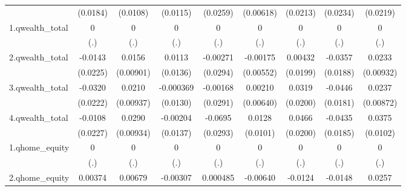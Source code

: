 {\begin{tabular}{l*{8}{c}}
            &    (0.0184)         &    (0.0108)         &    (0.0115)         &    (0.0259)         &   (0.00618)         &    (0.0213)         &    (0.0234)         &    (0.0219)         \\
[1em]
1.qwealth\_total&           0         &           0         &           0         &           0         &           0         &           0         &           0         &           0         \\
            &         (.)         &         (.)         &         (.)         &         (.)         &         (.)         &         (.)         &         (.)         &         (.)         \\
[1em]
2.qwealth\_total&     -0.0143         &      0.0156         &      0.0113         &    -0.00271         &    -0.00175         &     0.00432         &     -0.0357         &      0.0233\sym{*}  \\
            &    (0.0225)         &   (0.00901)         &    (0.0136)         &    (0.0294)         &   (0.00552)         &    (0.0199)         &    (0.0188)         &   (0.00932)         \\
[1em]
3.qwealth\_total&     -0.0320         &      0.0210\sym{*}  &   -0.000369         &    -0.00168         &     0.00210         &      0.0319         &     -0.0446\sym{*}  &      0.0237\sym{**} \\
            &    (0.0222)         &   (0.00937)         &    (0.0130)         &    (0.0291)         &   (0.00640)         &    (0.0200)         &    (0.0181)         &   (0.00872)         \\
[1em]
4.qwealth\_total&     -0.0108         &      0.0290\sym{**} &    -0.00204         &     -0.0695\sym{*}  &      0.0128         &      0.0466\sym{*}  &     -0.0435\sym{*}  &      0.0375\sym{***}\\
            &    (0.0227)         &   (0.00934)         &    (0.0137)         &    (0.0293)         &    (0.0101)         &    (0.0200)         &    (0.0185)         &    (0.0102)         \\
[1em]
1.qhome\_equity&           0         &           0         &           0         &           0         &           0         &           0         &           0         &           0         \\
            &         (.)         &         (.)         &         (.)         &         (.)         &         (.)         &         (.)         &         (.)         &         (.)         \\
[1em]
2.qhome\_equity&     0.00374         &     0.00679         &    -0.00307         &    0.000485         &    -0.00640         &     -0.0124         &     -0.0148         &      0.0257\sym{*}  \\

\end{tabular}}
